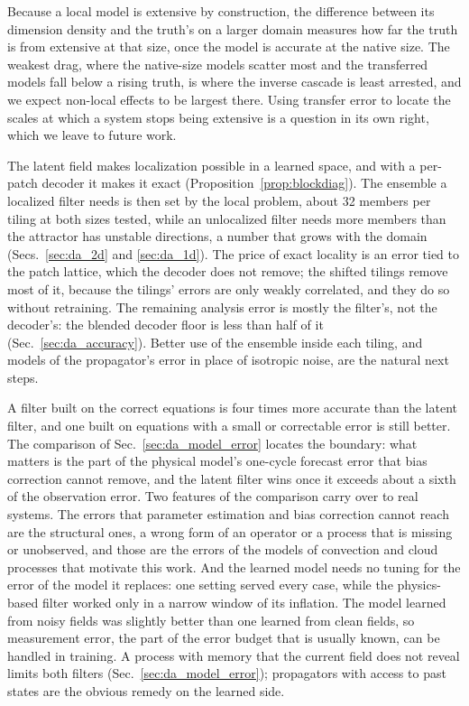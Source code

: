  Because a local model
is extensive by construction, the difference between its dimension
density and the truth's on a larger domain measures how far the truth is
from extensive at that size, once the model is accurate at the native
size. The weakest drag, where the native-size models scatter most and the
transferred models fall below a rising truth, is where the inverse
cascade is least arrested, and we expect non-local effects to be largest
there. Using
transfer error to locate the scales at which a system stops being
extensive is a question in its own right, which we leave to future work.

 The latent field makes
localization possible in a learned space, and with a per-patch decoder it
makes it exact (Proposition~\ref{prop:blockdiag}). The ensemble a localized
filter needs is then set by the local problem, about 32 members per tiling
at both sizes tested, while an unlocalized filter needs more members than the
attractor has unstable directions, a number that grows with the domain
(Secs.~\ref{sec:da_2d} and \ref{sec:da_1d}). The price of exact locality is
an error tied to the patch lattice, which the decoder does not remove; the
shifted tilings remove most of it, because the tilings' errors are only
weakly correlated, and they do so without retraining. The remaining
analysis error is mostly the filter's, not the decoder's: the blended
decoder floor is less than half of it (Sec.~\ref{sec:da_accuracy}). Better
use of the ensemble inside each tiling, and models of the propagator's
error in place of isotropic noise, are the natural next steps.

 A filter built on the correct
equations is four times more accurate than the latent filter, and one built
on equations with a small or correctable error is still better. The
comparison of Sec.~\ref{sec:da_model_error} locates the boundary: what
matters is the part of the physical model's one-cycle forecast error that
bias correction cannot remove, and the latent filter wins once it exceeds
about a sixth of the observation error. Two features of the comparison
carry over to real systems. The errors that parameter estimation and bias
correction cannot reach are the structural ones, a wrong form of an
operator or a process that is missing or unobserved, and those are the
errors of the models of convection and cloud processes that motivate this
work. And the learned model needs no tuning for the error of the model it
replaces: one setting served every case, while the physics-based filter
worked only in a narrow window of its inflation. The model learned from
noisy fields was slightly better than one learned from clean fields, so
measurement error, the part of the error budget that is usually known, can
be handled in training. A process with memory that the current field does
not reveal limits both filters (Sec.~\ref{sec:da_model_error}); propagators
with access to past states are the obvious remedy on the learned side.

